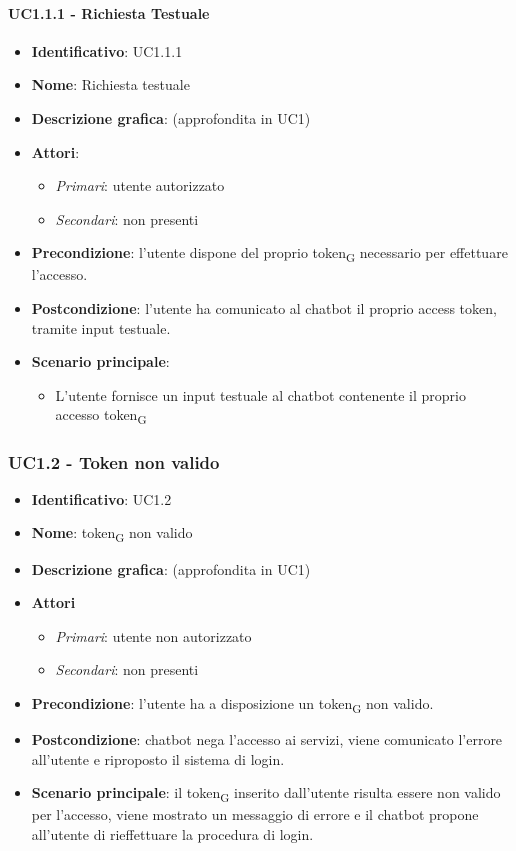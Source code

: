 \paragraph{UC1.1.1 - Richiesta Testuale}
\begin{itemize}
   \item \textbf{Identificativo}: UC1.1.1
   \item \textbf{Nome}: Richiesta testuale
   \item \textbf{Descrizione grafica}: (approfondita in UC1)
   \item \textbf{Attori}:
   \begin{itemize} 
       \item \textit{Primari}: utente autorizzato
       \item \textit{Secondari}: non presenti
   \end{itemize}
       \item \textbf{Precondizione}: l'utente dispone del proprio token\textsubscript{G} necessario per effettuare l'accesso.
       \item \textbf{Postcondizione}: l'utente ha comunicato al chatbot il proprio access token, tramite input testuale. 
    \item \textbf{Scenario principale}: 
       \begin{itemize}
           \item L'utente fornisce un input testuale al chatbot contenente il proprio accesso token\textsubscript{G} 
       \end{itemize}
\end{itemize}

\subsubsection{UC1.2 - Token non valido}
\begin{itemize}
    \item \textbf{Identificativo}: UC1.2
    \item \textbf{Nome}: token\textsubscript{G} non valido
    \item \textbf{Descrizione grafica}: (approfondita in UC1)
    \item \textbf{Attori}
 \begin{itemize} 
    \item \textit{Primari}: utente non autorizzato 
    \item \textit{Secondari}: non presenti
 \end{itemize}
 \item \textbf{Precondizione}: l'utente ha a disposizione un token\textsubscript{G} non valido.
 \item \textbf{Postcondizione}: chatbot nega l'accesso ai servizi, viene comunicato l'errore all'utente e riproposto il sistema di login.
 \item \textbf{Scenario principale}: il token\textsubscript{G} inserito dall'utente risulta essere non valido per l'accesso, viene mostrato un messaggio di errore e il chatbot propone all'utente di rieffettuare la procedura di login.
\end{itemize}
\newpage